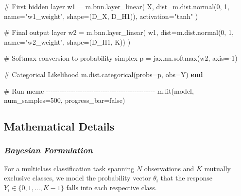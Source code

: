 \documentclass[
  letterpaper,
  DIV=11,
  numbers=noendperiod]{scrartcl}
\newenvironment{Shaded}{\begin{snugshade}}{\end{snugshade}}
\newcommand{\CommentTok}[1]{\textcolor[rgb]{0.37,0.37,0.37}{#1}}
\newcommand{\ConstantTok}[1]{\textcolor[rgb]{0.56,0.35,0.01}{#1}}
\newcommand{\FloatTok}[1]{\textcolor[rgb]{0.68,0.00,0.00}{#1}}
\newcommand{\FunctionTok}[1]{\textcolor[rgb]{0.28,0.35,0.67}{#1}}
\newcommand{\KeywordTok}[1]{\textcolor[rgb]{0.00,0.23,0.31}{\textbf{#1}}}
\newcommand{\NormalTok}[1]{\textcolor[rgb]{0.00,0.23,0.31}{#1}}
\newcommand{\OperatorTok}[1]{\textcolor[rgb]{0.37,0.37,0.37}{#1}}
\newcommand{\StringTok}[1]{\textcolor[rgb]{0.13,0.47,0.30}{#1}}
\begin{document}
\begin{Shaded}
\begin{Highlighting}[]
    \CommentTok{\# First hidden layer}
\NormalTok{    w1 }\OperatorTok{=}\NormalTok{ m.bnn.}\FunctionTok{layer\_linear}\NormalTok{(}
\NormalTok{        X, }
\NormalTok{        dist}\OperatorTok{=}\NormalTok{m.dist.}\FunctionTok{normal}\NormalTok{(}\FloatTok{0}\NormalTok{, }\FloatTok{1}\NormalTok{, name}\OperatorTok{=}\StringTok{"w1\_weight"}\NormalTok{, shape}\OperatorTok{=}\NormalTok{(D\_X, D\_H1)),}
\NormalTok{        activation}\OperatorTok{=}\StringTok{"tanh"}
\NormalTok{    )}
    
    \CommentTok{\# Final output layer }
\NormalTok{    w2 }\OperatorTok{=}\NormalTok{ m.bnn.}\FunctionTok{layer\_linear}\NormalTok{(}
\NormalTok{        w1,}
\NormalTok{        dist}\OperatorTok{=}\NormalTok{m.dist.}\FunctionTok{normal}\NormalTok{(}\FloatTok{0}\NormalTok{, }\FloatTok{1}\NormalTok{, name}\OperatorTok{=}\StringTok{"w2\_weight"}\NormalTok{, shape}\OperatorTok{=}\NormalTok{(D\_H1, K))}
\NormalTok{    )}
    
    \CommentTok{\# Softmax conversion to probability simplex}
\NormalTok{    p }\OperatorTok{=}\NormalTok{ jax.nn.}\FunctionTok{softmax}\NormalTok{(w2, axis}\OperatorTok{={-}}\FloatTok{1}\NormalTok{)}
    
    \CommentTok{\# Categorical Likelihood}
\NormalTok{    m.dist.}\FunctionTok{categorical}\NormalTok{(probs}\OperatorTok{=}\NormalTok{p, obs}\OperatorTok{=}\NormalTok{Y)}
\KeywordTok{end}

\CommentTok{\# Run mcmc {-}{-}{-}{-}{-}{-}{-}{-}{-}{-}{-}{-}{-}{-}{-}{-}{-}{-}{-}{-}{-}{-}{-}{-}{-}{-}{-}{-}{-}{-}{-}{-}{-}{-}{-}{-}{-}{-}{-}{-}{-}{-}{-}{-}{-}{-}{-}{-}}
\NormalTok{m.}\FunctionTok{fit}\NormalTok{(model, num\_samples}\OperatorTok{=}\FloatTok{500}\NormalTok{, progress\_bar}\OperatorTok{=}\ConstantTok{false}\NormalTok{)}
\end{Highlighting}
\end{Shaded}

\subsection{Mathematical Details}\label{mathematical-details}

\subsubsection{\texorpdfstring{\emph{Bayesian
Formulation}}{Bayesian Formulation}}\label{bayesian-formulation}

For a multiclass classification task spanning \(N\) observations and
\(K\) mutually exclusive classes, we model the probability vector
\(\theta_i\) that the response \(Y_i \in \{0, 1, ..., K-1\}\) falls into
each respective class.
\end{document}
